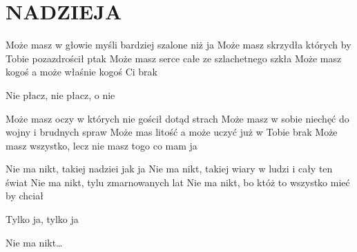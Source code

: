 \documentclass[../../../songbook.tex]{subfiles}
\begin{document}
\TabPositions{9cm} %
\section*{NADZIEJA}
{}
\vspace{0.5cm}
Może masz w głowie myśli bardziej szalone niż ja		 \newline
Może masz skrzydła których by Tobie pozazdrościł ptak  \newline
Może masz serce całe ze szlachetnego szkła  \newline
Może masz kogoś a może właśnie kogoś Ci brak  \newline

Nie płacz, nie płacz, o nie		 \newline

Może masz oczy w których nie gościł dotąd strach  \newline
Może masz w sobie niechęć do wojny i brudnych spraw  \newline
Może mas litość a może uczyć już w Tobie brak  \newline
Może masz wszystko, lecz nie masz togo co mam ja  \newline

\-\hspace{1cm} Nie ma nikt, takiej nadziei jak ja  \newline
\-\hspace{1cm} Nie ma nikt, takiej wiary w ludzi i cały ten świat  \newline
\-\hspace{1cm} Nie ma nikt, tylu zmarnowanych lat  \newline
\-\hspace{1cm} Nie ma nikt, bo któż to wszystko mieć by chciał \newline

Tylko ja, tylko ja			 \newline

\-\hspace{1cm} Nie ma nikt…  \newline
\end{document}
